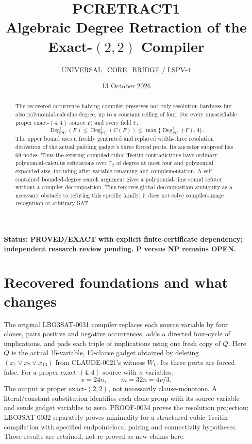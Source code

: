 \documentclass[11pt]{article}
\title{PCRETRACT1\\\large Algebraic Degree Retraction of the Exact-$(2,2)$ Compiler}
\author{UNIVERSAL\_CORE\_BRIDGE / LSPV-4}
\date{13 October 2026}
\newcommand{\PC}{\operatorname{PC}}
\newcommand{\F}{\mathbb F}
\newcommand{\degpc}{\operatorname{Deg}_{\PC}}
\begin{document}
\maketitle
\noindent\textbf{Status: PROVED/EXACT with explicit finite-certificate dependency; independent research review pending. P versus NP remains OPEN.}

\begin{abstract}
The recovered occurrence-halving compiler preserves not only resolution hardness but also polynomial-calculus degree, up to a constant ceiling of four. For every unsatisfiable proper exact-$(4,4)$ source $F$, and every field $\F$,
\[
\degpc^{\F}(F)\le \degpc^{\F}(C(F))
\le\max\{\degpc^{\F}(F),4\}.
\]
The upper bound uses a freshly generated and replayed width-three resolution derivation of the actual padding gadget's three forced ports. Its ancestor subproof has 69 nodes. Thus the existing compiled cubic Tseitin contradictions have ordinary polynomial-calculus refutations over $\F_2$ of degree at most four and polynomial expanded size, including after variable renaming and complementation. A self-contained bounded-degree search argument gives a polynomial-time sound refuter without a compiler decomposition. This removes global decomposition ambiguity as a necessary obstacle to refuting this specific family; it does not solve compiler-image recognition or arbitrary SAT.
\end{abstract}

\section{Recovered foundations and what changes}
The original LBO3SAT-0031 compiler replaces each source variable by four clones, pairs positive and negative occurrences, adds a directed four-cycle of implications, and pads each triple of implications using one fresh copy of $Q$. Here $Q$ is the actual 15-variable, 19-clause gadget obtained by deleting $(x_1\lor x_7\lor x_{13})$ from CLAUDE-0021's witness $W_1$. Its three ports are forced false. For a proper exact-$(4,4)$ source with $n$ variables,
\[
 v=24n,\qquad m=32n=4v/3.
\]
The output is proper exact-$(2,2)$, not necessarily clause-monotone. A literal/constant substitution identifies each clone group with its source variable and sends gadget variables to zero. PROOF-0034 proves the resolution projection; LBO3SAT-0032 separately proves minimality for a structured cubic Tseitin compilation with specified endpoint-local pairing and connectivity hypotheses. Those results are retained, not re-proved as new claims here.
\end{document}
